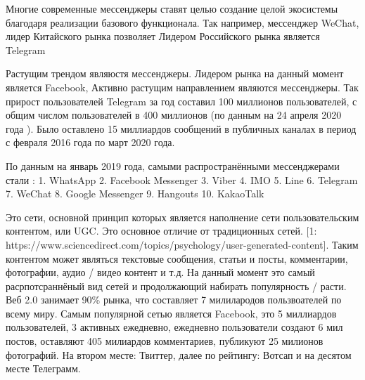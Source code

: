 \documentclass[a4paper,article,14pt]{extarticle}
\begin{document}
	Многие современные мессенджеры ставят целью создание целой экосистемы благодаря реализации базового функционала. Так например, мессенджер \flqq WeChat\frqq, лидер Китайского рынка позволяет
	Лидером Российского рынка является Telegram


Растущим трендом являюстя мессенджеры.  Лидером рынка на данный момент является Facebook,  Активно растущим направлением являются мессенджеры. Так прирост пользователей Telegram за год составил 100 миллионов пользователей, с общим числом пользователей в 400 миллионов (по данным на 24 апреля 2020 года \cite{cite3}). Было оставлено 15 миллиардов сообщений в публичных каналах в период с февраля 2016 года по март 2020 года.

По данным на январь 2019 года, самыми распространёнными мессенджерами стали \cite{cite4}:
1. WhatsApp
2. Facebook Messenger
3. Viber
4. IMO
5. Line
6. Telegram
7. WeChat
8. Google Messenger
9. Hangouts
10. KakaoTalk

Это сети, основной принцип которых является наполнение сети пользовательским контентом, или UGC. Это основное отличие от традиционных сетей. [1: https://www.sciencedirect.com/topics/psychology/user-generated-content]. Таким контентом может являться текстовые сообщения, статьи и посты, комментарии, фотографии, аудио / видео контент и т.д.
На данный момент это самый расрпотсраннёный вид сетей и продолжающий набирать популярность / расти.
Веб 2.0 занимает 90\% рынка, что составляет 7 милилародов пользвоателей по всему миру. Самым популярной сетью является Facebook, это 5 миллиардов пользователей, 3 активных ежедневно, ежедневно пользователи создают 6 мил постов, оставляют 405 милиардов комментариев, публикуют 25 милионов фотографий. На втором месте: Твиттер, далее по рейтингу: Вотсап и на десятом месте Телеграмм.
\end{document}
